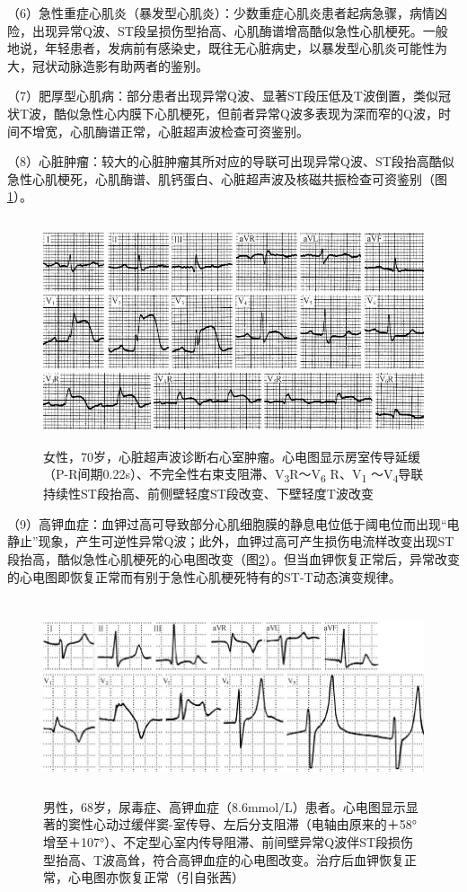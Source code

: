 （6）急性重症心肌炎（暴发型心肌炎）：少数重症心肌炎患者起病急骤，病情凶险，出现异常Q波、ST段呈损伤型抬高、心肌酶谱增高酷似急性心肌梗死。一般地说，年轻患者，发病前有感染史，既往无心脏病史，以暴发型心肌炎可能性为大，冠状动脉造影有助两者的鉴别。

（7）肥厚型心肌病：部分患者出现异常Q波、显著ST段压低及T波倒置，类似冠状T波，酷似急性心内膜下心肌梗死，但前者异常Q波多表现为深而窄的Q波，时间不增宽，心肌酶谱正常，心脏超声波检查可资鉴别。

（8）心脏肿瘤：较大的心脏肿瘤其所对应的导联可出现异常Q波、ST段抬高酷似急性心肌梗死，心肌酶谱、肌钙蛋白、心脏超声波及核磁共振检查可资鉴别（图\ref{fig44-18}）。

\begin{figure}[!htbp]
 \centering
 \includegraphics[width=5.04167in,height=2.61458in]{./images/Image00727.jpg}
 \captionsetup{justification=centering}
 \caption{女性，70岁，心脏超声波诊断右心室肿瘤。心电图显示房室传导延缓（P-R间期0.22s）、不完全性右束支阻滞、V\textsubscript{3}R～V\textsubscript{6} R、V\textsubscript{1} ～V\textsubscript{4}导联持续性ST段抬高、前侧壁轻度ST段改变、下壁轻度T波改变}
 \label{fig44-18}
  \end{figure} 


（9）高钾血症：血钾过高可导致部分心肌细胞膜的静息电位低于阈电位而出现“电静止”现象，产生可逆性异常Q波；此外，血钾过高可产生损伤电流样改变出现ST段抬高，酷似急性心肌梗死的心电图改变（图\ref{fig44-19}）。但当血钾恢复正常后，异常改变的心电图即恢复正常而有别于急性心肌梗死特有的ST-T动态演变规律。

\begin{figure}[!htbp]
 \centering
 \includegraphics[width=5.78125in,height=2.27083in]{./images/Image00728.jpg}
 \captionsetup{justification=centering}
 \caption{男性，68岁，尿毒症、高钾血症（8.6mmol/L）患者。心电图显示显著的窦性心动过缓伴窦-室传导、左后分支阻滞（电轴由原来的＋58°增至＋107°）、不定型心室内传导阻滞、前间壁异常Q波伴ST段损伤型抬高、T波高耸，符合高钾血症的心电图改变。治疗后血钾恢复正常，心电图亦恢复正常（引自张茜）}
 \label{fig44-19}
  \end{figure} 

